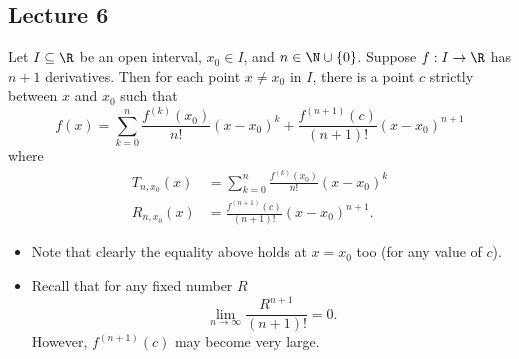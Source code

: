 \subsection{Lecture 6}

\begin{theorem}\label{Taylor's Theorem with Lagrange remainder}
    Let \( I \subseteq  \R   \) be an open interval, \( {x}_{0} \in I  \), and \( n \in \N \cup \{ 0  \}  \). Suppose \( f: I \to \R  \) has \( n + 1  \) derivatives. Then for each point \( x \neq {x}_{0} \) in \( I  \), there is a point \( c  \) strictly between \( x  \) and \( {x}_{0} \) such that 
    \[  f(x) = \sum_{ k=0  }^{  n } \frac{ f^{(k)}({x}_{0})  }{ n!  } (x - {x}_{0})^{k} + \frac{ f^{(n+1)}(c) }{  (n+1)! } (x - {x}_{0})^{n+1} \]
    where 
    \begin{align*}
        {T}_{n,{x}_{0}}(x) &= \sum_{ k=0  }^{ n } \frac{ f^{(k)}({x}_{0}) }{ n!  }  ( x - {x}_{0})^{k} \\
        {R}_{n,{x}_{0}}(x) &= \frac{ f^{(n+1)}(c) }{  (n+1)! }  (x - {x}_{0})^{n+1}.
    \end{align*}
\end{theorem}

\begin{remark}
    \begin{itemize}
        \item Note that clearly the equality above holds at \( x = {x}_{0} \) too (for any value of \( c  \)).
        \item Recall that for any fixed number \( R  \)
            \[ \lim_{ n \to \infty  }  \frac{ R^{n+1} }{ (n+1)! }  = 0.   \]
            However, \( f^{(n+1)}(c) \) may become very large.
    \end{itemize}
\end{remark}

